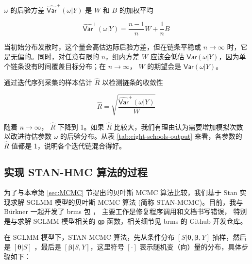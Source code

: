 \documentclass[12pt,a4paper,UTF8,twoside]{book}
\theoremstyle{definition}
\theoremstyle{definition}
\theoremstyle{definition}
\theoremstyle{remark}
\begin{document}
\noindent \(\omega\) 的后验方差 \(\widehat{\mathsf{Var}}^{+}(\omega|Y)\)
是 \(W\) 和 \(B\) 的加权平均

\begin{equation}
\widehat{\mathsf{Var}}^{+}(\omega|Y) = \frac{n-1}{n} W + \frac{1}{n} B 
\end{equation}

当初始分布发散时，这个量会高估边际后验方差，但在链条平稳或
\(n \to \infty\) 时，它是无偏的。同时，对任意有限的 \(n\)，组内方差
\(W\) 应该会低估
\(\mathsf{Var}(\omega|Y)\)，因为单个链条没有时间覆盖目标分布；在
\(n \to \infty\)， \(W\) 的期望会是 \(\mathsf{Var}(\omega|Y)\)。

通过迭代序列采集的样本估计 \(\hat{R}\) 以检测链条的收敛性

\begin{equation}
\hat{R} = \sqrt{\frac{\widehat{\mathsf{Var}}^{+}(\omega|Y)}{W}}
\end{equation}

\noindent 随着 \(n \to \infty\)， \(\hat{R}\) 下降到 1。如果 \(\hat{R}\)
比较大，我们有理由认为需要增加模拟次数以改进待估参数 \(\omega\)
的后验分布。从表 \ref{tab:eight-schools-output} 来看，各参数的
\(\hat{R}\) 值都是 1，说明各个迭代链混合得好。

\hypertarget{subsec:stan-hmc}{%
\subsection{实现 STAN-HMC 算法的过程}\label{subsec:stan-hmc}}

为了与本章第 \ref{sec:MCMC} 节提出的贝叶斯 MCMC 算法比较，我们基于 Stan
实现求解 SGLMM 模型的贝叶斯 MCMC 算法 (简称 STAN-MCMC)。目前，我与
Bürkner 一起开发了 brms 包 \citep{brms2017JSS}，
主要工作是修复程序调用和文档书写错误， 特别是与求解 SGLMM 模型相关的
\texttt{gp} 函数，相关细节见 brms 的 Github 开发仓库。

在 SGLMM 模型下，STAN-MCMC 算法，先从条件分布
\([S|\boldsymbol{\theta},\boldsymbol{\beta},Y]\) 抽样，然后是
\([\boldsymbol{\theta}|S]\) ，最后是
\([\boldsymbol{\beta}|S,Y]\)，这里符号 \([\cdot]\)
表示随机变（向）量的分布，具体步骤如下：
\end{document}
